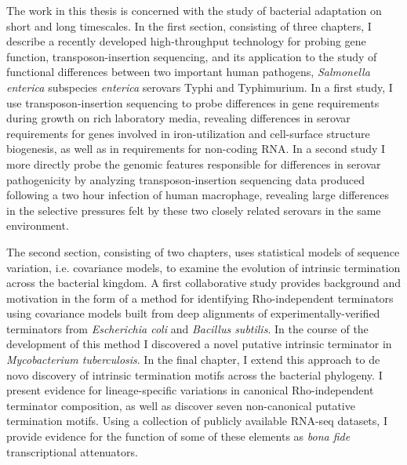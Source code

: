 


\begin{abstracts}        %

The work in this thesis is concerned with the study of bacterial adaptation on short and long timescales. In the first section, consisting of three chapters, I describe a recently developed high-throughput technology for probing gene function, transposon-insertion sequencing, and its application to the study of functional differences between two important human pathogens, \textit{Salmonella enterica} subspecies \textit{enterica} serovars Typhi and Typhimurium. In a first study, I use transposon-insertion sequencing to probe differences in gene requirements during growth on rich laboratory media, revealing differences in serovar requirements for genes involved in iron-utilization and cell-surface structure biogenesis, as well as in requirements for non-coding RNA. In a second study I more directly probe the genomic features responsible for differences in serovar pathogenicity by analyzing transposon-insertion sequencing data produced following a two hour infection of human macrophage, revealing large differences in the selective pressures felt by these two closely related serovars in the same environment.

The second section, consisting of two chapters, uses statistical models of sequence variation, i.e. covariance models, to examine the evolution of intrinsic termination across the bacterial kingdom. A first collaborative study provides background and motivation in the form of a method for identifying Rho-independent terminators using covariance models built from deep alignments of experimentally-verified terminators from \textit{Escherichia coli} and \textit{Bacillus subtilis}. In the course of the development of this method I discovered a novel putative intrinsic terminator in \textit{Mycobacterium tuberculosis}. In the final chapter, I extend this approach to de novo discovery of intrinsic termination motifs across the bacterial phylogeny. I present evidence for lineage-specific variations in canonical Rho-independent terminator composition, as well as discover seven non-canonical putative termination motifs. Using a collection of publicly available RNA-seq datasets, I provide evidence for the function of some of these elements as \textit{bona fide} transcriptional attenuators.

\end{abstracts}




